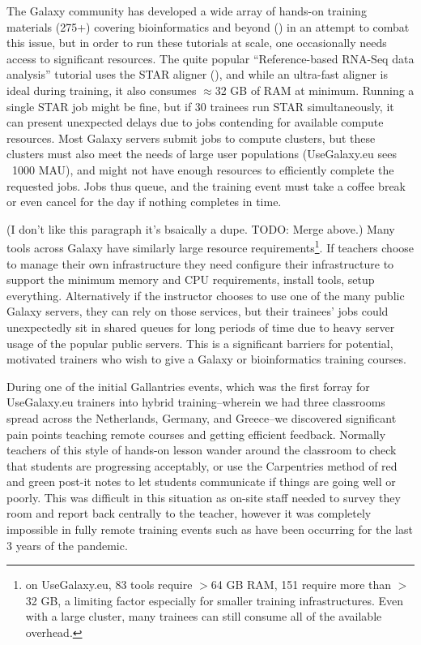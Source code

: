 \documentclass[a4paper,num-refs]{oup-contemporary}
\begin{document}
The Galaxy community has developed a wide array of hands-on training materials (275+) covering bioinformatics and beyond (\cite{training-site}) in an attempt to combat this issue, but in order to run these tutorials at scale, one occasionally needs access to significant resources. The quite popular ``Reference-based RNA-Seq data analysis'' tutorial uses the STAR aligner (\cite{Dobin2012}), and while an ultra-fast aligner is ideal during training, it also consumes $\approx$32 GB of RAM at minimum. Running a single STAR job might be fine, but if 30 trainees run STAR simultaneously, it can present unexpected delays due to jobs contending for available compute resources. Most Galaxy servers submit jobs to compute clusters, but these clusters must also meet the needs of large user populations (UseGalaxy.eu sees ~1000 MAU), and might not have enough resources to efficiently complete the requested jobs. Jobs thus queue, and the training event must take a coffee break or even cancel for the day if nothing completes in time.

(I don't like this paragraph it's bsaically a dupe. TODO: Merge above.)
Many tools across Galaxy have similarly large resource requirements\footnote{on UseGalaxy.eu, 83 tools require $>$64 GB RAM, 151 require more than $>$32 GB, a limiting factor especially for smaller training infrastructures. Even with a large cluster, many trainees can still consume all of the available overhead.}. If teachers choose to manage their own infrastructure they need configure their infrastructure to support the minimum memory and CPU requirements, install tools, setup everything. Alternatively if the instructor chooses to use one of the many public Galaxy servers, they can rely on those services, but their trainees' jobs could unexpectedly sit in shared queues for long periods of time due to heavy server usage of the popular public servers. This is a significant barriers for potential, motivated trainers who wish to give a Galaxy or bioinformatics training courses.

During one of the initial Gallantries events, which was the first forray for UseGalaxy.eu trainers into hybrid training--wherein we had three classrooms spread across the Netherlands, Germany, and Greece--we discovered significant pain points teaching remote courses and getting efficient feedback. Normally teachers of this style of hands-on lesson wander around the classroom to check that students are progressing acceptably, or use the Carpentries method of red and green post-it notes to let students communicate if things are going well or poorly. This was difficult in this situation as on-site staff needed to survey they room and report back centrally to the teacher, however it was completely impossible in fully remote training events such as have been occurring for the last 3 years of the pandemic.
\end{document}
